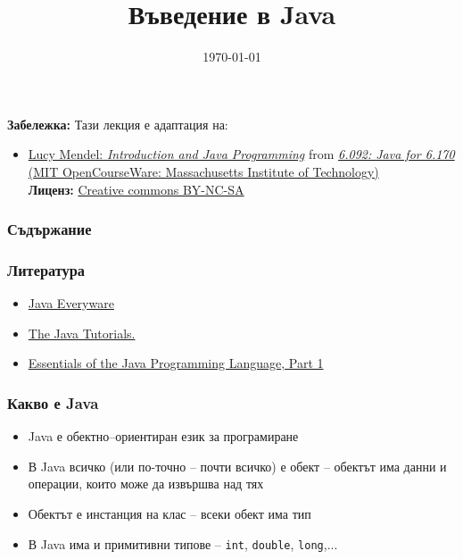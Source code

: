 \documentclass[ignorenonframetext, hyperref=unicode,unicode]{beamer}
\title{Въведение в Java}
\date{\today}
\begin{document}
\frame{\titlepage}

\begin{frame}


\small
{\bf Забележка:} Тази лекция е адаптация на:
\begin{itemize}
  \item \href{http://ocw.mit.edu/NR/rdonlyres/Electrical-Engineering-and-Computer-Science/6-092January--IAP--2006/2C5A832A-E1BA-4104-A129-CC998C7B95FC/0/lecture1a.pdf}{Lucy Mendel: {\em Introduction and Java Programming}} from
\href{http://ocw.mit.edu/OcwWeb/Electrical-Engineering-and-Computer-Science/6-092January--IAP--2006/CourseHome/index.htm}{
{\em 6.092: Java for 6.170} (MIT OpenCourseWare:
Massachusetts Institute of Technology)}\\
{\bf Лиценз:}
\href{http://ocw.mit.edu/OcwWeb/web/terms/terms/index.htm\#cc}{Creative commons
BY-NC-SA}  

\end{itemize}


\end{frame}

\begin{frame}
\frametitle{Съдържание}
\tableofcontents %
\end{frame}


\begin{frame}
 \frametitle{Литература}
\begin{itemize}
\item
\href{http://computing.open.ac.uk/m254/}{Java Everyware}
\item
\href{http://java.sun.com/docs/books/tutorial/index.html}{The
Java Tutorials.}
\item
\href{http://java.sun.com/developer/onlineTraining/Programming/BasicJava1/}{Essentials of the Java Programming Language, Part 1}

\end{itemize}
\end{frame}

\begin{frame}
 \frametitle{Какво е Java}
\begin{itemize}
\item Java е обектно–ориентиран език за програмиране
\item В Java всичко (или по-точно -- почти всичко) е обект -- обектът има данни и операции, които може да извършва над тях
\item Обектът е инстанция на клас -- всеки обект има тип
\item В Java има и примитивни типове -- \lstinline{int},  \lstinline{double}, \lstinline{long},...
\end{itemize}
\end{frame}
\end{document}
